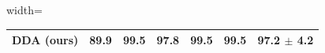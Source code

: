 \documentclass{article}
\begin{document}
\begin{table}[tb!]
\begin{minipage}[t]{0.43\textwidth}
\begin{adjustbox}{width=\linewidth}
\begin{tabular}{lcccccl}
      \midrule
      \rowcolor{myblue}
      \rowcolor{myblue}
      \rowcolor{myblue}
      \rowcolor{myblue}
\textbf{DDA (ours)} & \textbf{89.9} & \textbf{99.5} & \textbf{97.8} & \textbf{99.5} & \textbf{99.5} & \textbf{97.2} $\pm$ 4.2 \\
\bottomrule
      \end{tabular}
      \end{adjustbox}
      \vspace{0pt}
  \end{minipage}
\vspace{-10pt}
\end{table}
\end{document}
